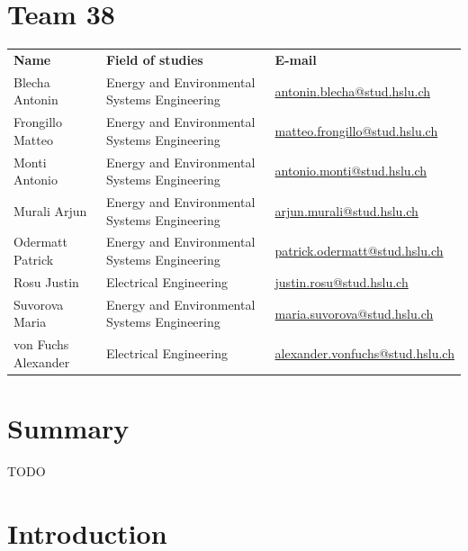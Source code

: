 \documentclass{article}
\begin{document}
\newpage
\section*{Team 38}
\renewcommand{\arraystretch}{1.5}
\begin{tabular}{@{}p{}p{}p{}@{}}
\textbf{Name} & \textbf{Field of studies} & \textbf{E-mail} \\
Blecha Antonin & Energy and Environmental Systems Engineering & \href{mailto:antonin.blecha@stud.hslu.ch}{antonin.blecha@stud.hslu.ch} \\
Frongillo Matteo & Energy and Environmental Systems Engineering & \href{mailto:matteo.frongillo@stud.hslu.ch}{matteo.frongillo@stud.hslu.ch} \\
Monti Antonio & Energy and Environmental Systems Engineering & \href{mailto:antonio.monti@stud.hslu.ch}{antonio.monti@stud.hslu.ch} \\
Murali Arjun & Energy and Environmental Systems Engineering & \href{mailto:arjun.murali@stud.hslu.ch}{arjun.murali@stud.hslu.ch} \\
Odermatt Patrick & Energy and Environmental Systems Engineering & \href{mailto:patrick.odermatt@stud.hslu.ch}{patrick.odermatt@stud.hslu.ch} \\
Rosu Justin & Electrical Engineering & \href{mailto:justin.rosu@stud.hslu.ch}{justin.rosu@stud.hslu.ch} \\
Suvorova Maria & Energy and Environmental Systems Engineering & \href{mailto:maria.suvorova@stud.hslu.ch}{maria.suvorova@stud.hslu.ch} \\
von Fuchs Alexander & Electrical Engineering & \href{mailto:alexander.vonfuchs@stud.hslu.ch}{alexander.vonfuchs@stud.hslu.ch} \\
\end{tabular}

\vspace*{1cm}

\newpage
\section*{Summary}
TODO
\newpage

\tableofcontents
\newpage

\section{Introduction}
\end{document}
